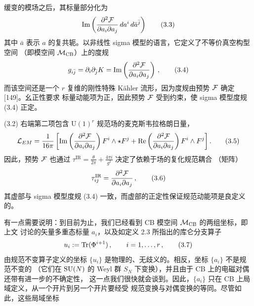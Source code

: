 
缓变的模场之后，其标量部分化为
\begin{equation}
  \operatorname{Im}\left(\frac{\partial^2\mathcal{F}}{\partial a_i\partial a_j}\,da^i\,d\bar a^{\bar j}\right)
  \tag{3.3}
\end{equation}
其中 $\bar a$ 表示 $a$ 的复共轭。以非线性 sigma 模型的语言，它定义了不等价真空构型空间
（即模空间 $\mathcal{M}_{\mathrm{CB}}$）上的度规
\begin{equation}
  g_{i\bar j} = \partial_i\partial_{\bar j}K
  = \operatorname{Im}\left(\frac{\partial^2\mathcal{F}}{\partial a_i\partial a_j}\right)\,,
  \tag{3.4}
\end{equation}
而该空间还是一个 $r$ 复维的刚性特殊 Kähler 流形，因为度规由预势 $\mathcal{F}$ 确定 [149]。幺正性要求
标量动能项为正，因此预势 $\mathcal{F}$ 受到约束，使 sigma 模型度规 (3.4) 正定。


(3.2) 右端第二项包含 $\mathrm{U}(1)^r$ 规范场的麦克斯韦拉格朗日量，
\begin{equation}
  \mathcal{L}_{EM} = \frac{1}{16\pi}\left[
  \operatorname{Im}\left(\frac{\partial^2\mathcal{F}}{\partial a_i\partial a_j}\right)F^i\wedge\star F^j
  + \operatorname{Re}\left(\frac{\partial^2\mathcal{F}}{\partial a_i\partial a_j}\right)F^i\wedge F^j\right].
  \tag{3.5}
\end{equation}
因此，预势 $\mathcal{F}$ 也通过
$\tau^{\mathrm{IR}}=\frac{\theta}{2\pi}+\frac{4\pi i}{g^2}$ 决定了依赖于场的复化规范耦合
（矩阵）
\begin{equation}
  \tau^{\mathrm{IR}}_{ij} = \frac{\partial^2\mathcal{F}}{\partial a_i\partial a_j}\,,
  \tag{3.6}
\end{equation}
其虚部与 sigma 模型度规 (3.4) 一致，而虚部的正定性保证规范动能项是良定义的。

有一点需要说明：到目前为止，我们已经看到 CB 模空间 $\mathcal{M}_{\mathrm{CB}}$ 的两组坐标，即上文
讨论的矢量多重态标量 $a_i$，以及如定义 2.3 所指出的库仑分支算子
\begin{equation}
  u_i := \operatorname{Tr}(\Phi^{i+1})\,,\qquad i=1,\ldots,r\,,
  \tag{3.7}
\end{equation}
由规范不变算子定义的坐标 $\{u_i\}$ 是物理的、无歧义的。相反，坐标 $\{a_i\}$ 不是规范不变的
（它们在 $\mathrm{SU}(N)$ 的 Weyl 群 $S_N$ 下变换），并且由于 CB 上的电磁对偶还带有进一步的不确定性，
这一点我们很快就会谈到。因此，$\{a_i\}$ 只在 CB 上局域定义，从一个开片到另一个开片要经受
规范变换与对偶变换的等同。尽管如此，这些局域坐标

